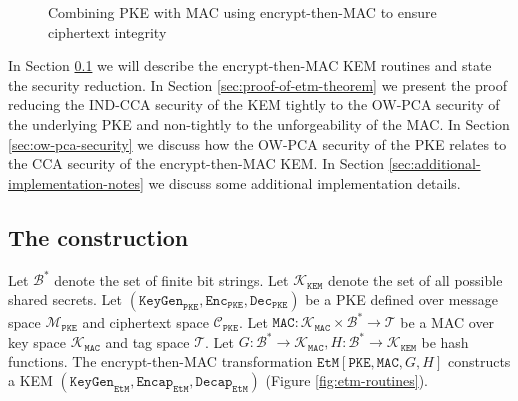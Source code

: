 \documentclass[runningheads]{llncs}
\newcommand{\pke}{\texttt{PKE}}
\newcommand{\keygen}{\texttt{KeyGen}}
\newcommand{\encrypt}{\texttt{Enc}}
\newcommand{\decrypt}{\texttt{Dec}}
\newcommand{\kem}{\texttt{KEM}}
\newcommand{\encap}{\texttt{Encap}}
\newcommand{\decap}{\texttt{Decap}}
\newcommand{\etm}{\texttt{EtM}}  %
\newcommand{\mac}{\texttt{MAC}}
\newcommand{\pk}{\texttt{pk}}
\newcommand{\leftsample}{\stackrel{\$}{\leftarrow}}
\begin{document}
\begin{figure}[h]
    \centering

    \caption{Combining PKE with MAC using encrypt-then-MAC to ensure ciphertext integrity}\label{fig:etm-encap-data-flow}
\end{figure}

In Section \ref{sec:etm-construction} we will describe the encrypt-then-MAC KEM routines and state the security reduction. In Section \ref{sec:proof-of-etm-theorem} we present the proof reducing the IND-CCA security of the KEM tightly to the OW-PCA security of the underlying PKE and non-tightly to the unforgeability of the MAC. In Section \ref{sec:ow-pca-security} we discuss how the OW-PCA security of the PKE relates to the CCA security of the encrypt-then-MAC KEM. In Section \ref{sec:additional-implementation-notes} we discuss some additional implementation details.

\subsection{The construction}\label{sec:etm-construction}
Let $\mathcal{B}^\ast$ denote the set of finite bit strings. Let $\mathcal{K}_\kem$ denote the set of all possible shared secrets. Let $(\keygen_\pke, \encrypt_\pke, \decrypt_\pke)$ be a PKE defined over message space $\mathcal{M}_\pke$ and ciphertext space $\mathcal{C}_\pke$. Let $\mac: \mathcal{K}_\mac \times \mathcal{B}^\ast \rightarrow \mathcal{T}$ be a MAC over key space $\mathcal{K}_\mac$ and tag space $\mathcal{T}$. Let $G: \mathcal{B}^\ast \rightarrow \mathcal{K}_\mac, H: \mathcal{B}^\ast \rightarrow \mathcal{K}_\kem$ be hash functions. The encrypt-then-MAC transformation $\etm[\pke,\mac,G,H]$ constructs a KEM $(\keygen_\etm, \encap_\etm, \decap_\etm)$ (Figure \ref{fig:etm-routines}).
\end{document}
